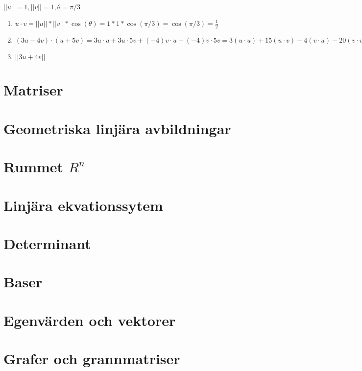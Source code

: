 \documentclass{article}
\begin{document}
\subsection{}
\begin{math}
    ||u||=1, 
    ||v||=1,
    \theta=\pi/3
\end{math}
\begin{enumerate}
    \item[a)]
        \begin{math}
            u\cdot v
            =||u||*||v||*\cos(\theta)
            =1*1*\cos(\pi/3)
            =\cos(\pi/3)
            =\frac{1}{2}
        \end{math}
    \item[b)]
        \begin{math}
            (3u-4v)\cdot (u+5v)
            =3u\cdot u+3u\cdot 5v+(-4)v\cdot u+(-4)v\cdot 5v
            =3(u\cdot u)+15(u\cdot v)-4(v\cdot u)-20(v\cdot v)
            =3*1+15*0.5-4*0.5-20*1
            =3+7.5-2-20
            =\frac{6}{2}+\frac{15}{2}-\frac{4}{2}-\frac{40}{2}
            =\frac{-23}{2}
        \end{math}
    \item[c)]
        \begin{math}
            ||3u+4v||
        \end{math}
\end{enumerate}
\section{Matriser}
\section{Geometriska linjära avbildningar}
\section{Rummet $R^n$}
\section{Linjära ekvationssytem}
\section{Determinant}
\section{Baser}
\section{Egenvärden och vektorer}
\section{Grafer och grannmatriser}
\end{document}
